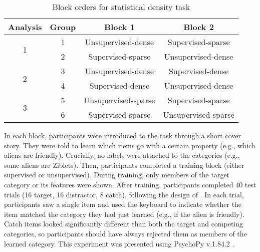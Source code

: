\documentclass[../dissertation.tex]{subfiles}
\begin{document}
\begin{wraptable}[11]{r}{0.6\linewidth}
\caption{Block orders for statistical density task}
\begin{center}
\begin{tabular}{ c|c|c|c } 
 \hline 
 Analysis & Group & Block 1 & Block 2 \\ 
 \hline
 \multirow{2}{*}{1} & 1 & Unsupervised-dense & Supervised-sparse \\ 
 & 2 & Supervised-sparse & Unsupervised-dense \\ 
 \hline
  \multirow{2}{*}{2} & 3 & Unsupervised-dense & Supervised-dense \\ 
 & 4 & Supervised-dense & Unsupervised-dense \\
 \hline 
  \multirow{2}{*}{3} & 5 & Unsupervised-sparse & Supervised-sparse \\ 
 & 6 & Supervised-sparse & Unsupervised-sparse \\ 
 \hline
\end{tabular}
\end{center}
\vspace{-20pt}
\label{exp1order}
\end{wraptable} \par
 In each block, participants were introduced to the task through a short cover story. They were told to learn which items go with a certain property (e.g., which aliens are friendly). Crucially, no labels were attached to the categories (e.g., some aliens are Ziblets). Then, participants completed a training block (either supervised or unsupervised). During training, only members of the target category or its features were shown. After training, participants completed 40 test trials (16 target, 16 distractor, 8 catch), following the design of \citet{Kloos2008}. In each trial, participants saw a single item and used the keyboard to indicate whether the item matched the category they had just learned (e.g., if the alien is friendly). Catch items looked significantly different than both the target and competing categories, so participants should have always rejected them as members of the learned category. This experiment was presented using PsychoPy v.1.84.2 \citep{Peirce2007}. \par
\end{document}
